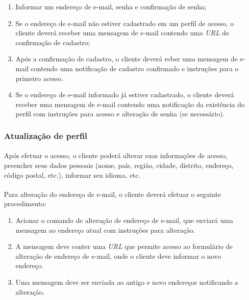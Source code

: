 \documentclass[a4paper,12pt]{article}
\def\url{\emph{URL}}
\begin{document}
\begin{enumerate}
\item Informar um endereço de e-mail, senha e confirmação de senha;
\item Se o endereço de e-mail não estiver cadastrado em um perfil de acesso, o
cliente deverá receber uma mensagem de e-mail contendo uma \url{} de
confirmação de cadastro;
\item Após a confirmação de cadastro, o cliente deverá reber uma mensagem de
e-mail contendo uma notificação de cadastro confirmado e instruções para o
primeiro acesso.
\item Se o endereço de e-mail informado já estiver cadastrado, o cliente deverá
receber uma mensagem de e-mail contendo uma notificação da existência do perfil
com instruções para acesso e alteração de senha (se necessário).
\end{enumerate}

\subsubsection{Atualização de perfil}

\paragraph{}
Após efetuar o acesso, o cliente poderá alterar suas informações de acesso,
preencher seus dados pessoais (nome, país, região, cidade, distrito, endereço,
código postal, etc.), informar seu idioma, etc.

\paragraph{}
Para alteração do endereço de e-mail, o cliente deverá efetuar o seguinte
procedimento:

\begin{enumerate}

\item Acionar o comando de alteração de endereço de e-mail, que enviará uma
mensagem ao endereço atual com instruções para alteração.

\item A mensagem deve conter uma \url{} que permite acesso ao formulário de
alteração de endereço de e-mail, onde o cliente deve informar o novo endereço.

\item Uma mensagem deve ser enviada ao antigo e novo endereços notificando a
alteração.

\end{enumerate}
\end{document}
